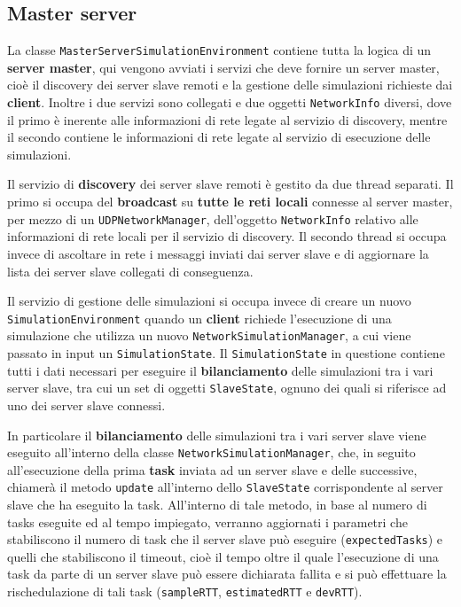 \subsection{Master server}

La classe \texttt{MasterServerSimulationEnvironment} contiene tutta la logica di un \textbf{server master}, qui vengono avviati i servizi che deve fornire un server master, cioè il discovery dei server slave remoti e la gestione delle simulazioni richieste dai \textbf{client}. Inoltre i due servizi sono collegati e due oggetti \texttt{NetworkInfo} diversi, dove il primo è inerente alle informazioni di rete legate al servizio di discovery, mentre il secondo contiene le informazioni di rete legate al servizio di esecuzione delle simulazioni.

Il servizio di \textbf{discovery} dei server slave remoti è gestito da due thread separati. Il primo si occupa del \textbf{broadcast} su \textbf{tutte le reti locali} connesse al server master, per mezzo di un \texttt{UDPNetworkManager}, dell'oggetto \texttt{NetworkInfo} relativo alle informazioni di rete locali per il servizio di discovery. Il secondo thread si occupa invece di ascoltare in rete i messaggi inviati dai server slave e di aggiornare la lista dei server slave collegati di conseguenza.

Il servizio di gestione delle simulazioni si occupa invece di creare un nuovo \texttt{SimulationEnvironment} quando un \textbf{client} richiede l'esecuzione di una simulazione che utilizza un nuovo \texttt{NetworkSimulationManager}, a cui viene passato in input un \texttt{SimulationState}. Il \texttt{SimulationState} in questione contiene tutti i dati necessari per eseguire il \textbf{bilanciamento} delle simulazioni tra i vari server slave, tra cui un set di oggetti \texttt{SlaveState}, ognuno dei quali si riferisce ad uno dei server slave connessi.

In particolare il \textbf{bilanciamento} delle simulazioni tra i vari server slave viene eseguito all'interno della classe \texttt{NetworkSimulationManager}, che, in seguito all'esecuzione della prima \textbf{task} inviata ad un server slave e delle successive, chiamerà il metodo \texttt{update} all'interno dello \texttt{SlaveState} corrispondente al server slave che ha eseguito la task. All'interno di tale metodo, in base al numero di tasks eseguite ed al tempo impiegato, verranno aggiornati i parametri che stabiliscono il numero di task che il server slave può eseguire (\texttt{expectedTasks}) e quelli che stabiliscono il timeout, cioè il tempo oltre il quale l'esecuzione di una task da parte di un server slave può essere dichiarata fallita e si può effettuare la rischedulazione di tali task (\texttt{sampleRTT}, \texttt{estimatedRTT} e \texttt{devRTT}).


